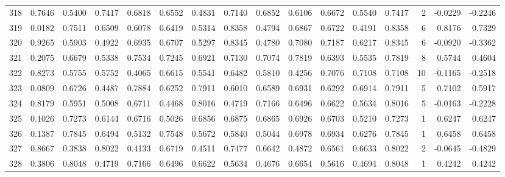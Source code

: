 \begin{tabular}{lrrrrrrrrrrrrrrr}
318 &      0.7646 &  0.5400 &  0.7417 &  0.6818 &  0.6552 &  0.4831 &  0.7140 &  0.6852 &  0.6106 &  0.6672 &   0.5540 &     0.7417 &      2 &                   -0.0229 &                    -0.2246 \\
319 &      0.0182 &  0.7511 &  0.6509 &  0.6078 &  0.6419 &  0.5314 &  0.8358 &  0.4794 &  0.6867 &  0.6722 &   0.4191 &     0.8358 &      6 &                    0.8176 &                     0.7329 \\
320 &      0.9265 &  0.5903 &  0.4922 &  0.6935 &  0.6707 &  0.5297 &  0.8345 &  0.4780 &  0.7080 &  0.7187 &   0.6217 &     0.8345 &      6 &                   -0.0920 &                    -0.3362 \\
321 &      0.2075 &  0.6679 &  0.5338 &  0.7534 &  0.7245 &  0.6921 &  0.7130 &  0.7074 &  0.7819 &  0.6393 &   0.5535 &     0.7819 &      8 &                    0.5744 &                     0.4604 \\
322 &      0.8273 &  0.5755 &  0.5752 &  0.4065 &  0.6615 &  0.5541 &  0.6482 &  0.5810 &  0.4256 &  0.7076 &   0.7108 &     0.7108 &     10 &                   -0.1165 &                    -0.2518 \\
323 &      0.0809 &  0.6726 &  0.4487 &  0.7884 &  0.6252 &  0.7911 &  0.6010 &  0.6589 &  0.6931 &  0.6292 &   0.6914 &     0.7911 &      5 &                    0.7102 &                     0.5917 \\
324 &      0.8179 &  0.5951 &  0.5008 &  0.6711 &  0.4468 &  0.8016 &  0.4719 &  0.7166 &  0.6496 &  0.6622 &   0.5634 &     0.8016 &      5 &                   -0.0163 &                    -0.2228 \\
325 &      0.1026 &  0.7273 &  0.6144 &  0.6716 &  0.5026 &  0.6856 &  0.6875 &  0.6865 &  0.6926 &  0.6703 &   0.5210 &     0.7273 &      1 &                    0.6247 &                     0.6247 \\
326 &      0.1387 &  0.7845 &  0.6494 &  0.5132 &  0.7548 &  0.5672 &  0.5840 &  0.5044 &  0.6978 &  0.6934 &   0.6276 &     0.7845 &      1 &                    0.6458 &                     0.6458 \\
327 &      0.8667 &  0.3838 &  0.8022 &  0.4133 &  0.6719 &  0.4511 &  0.7477 &  0.6642 &  0.4872 &  0.6561 &   0.6633 &     0.8022 &      2 &                   -0.0645 &                    -0.4829 \\
328 &      0.3806 &  0.8048 &  0.4719 &  0.7166 &  0.6496 &  0.6622 &  0.5634 &  0.4676 &  0.6654 &  0.5616 &   0.4694 &     0.8048 &      1 &                    0.4242 &                     0.4242 \\

\end{tabular}
